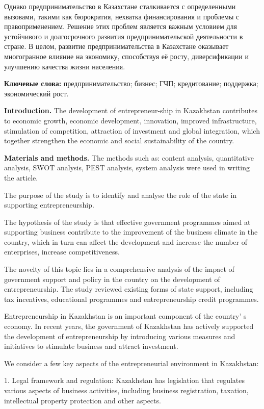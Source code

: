 Однако предпринимательство в Казахстане сталкивается с определенными
вызовами, такими как бюрократия, нехватка финансирования и проблемы с
правоприменением. Решение этих проблем является важным условием для
устойчивого и долгосрочного развития предпринимательской деятельности в
стране. В целом, развитие предпринимательства в Казахстане оказывает
многогранное влияние на экономику, способствуя её росту, диверсификации
и улучшению качества жизни населения.
\begingroup
\setlength{\parskip}{0pt}

{\bfseries Ключевые слова:} предпринимательство; бизнес; ГЧП; кредитование;
поддержка; экономический рост.

\begin{multicols}{2}
{\bfseries Introduction.} The development of entrepreneur-ship in Kazakhstan
contributes to economic growth, economic development, innovation,
improved infrastructure, stimulation of competition, attraction of
investment and global integration, which together strengthen the
economic and social sustainability of the country.

{\bfseries Materials and methods.} The methods such as: content analysis,
quantitative analysis, SWOT analysis, PEST analysis, system analysis
were used in writing the article.

The purpose of the study is to identify and analyse the role of the
state in supporting entrepreneurship.

The hypothesis of the study is that effective government programmes
aimed at supporting business contribute to the improvement of the
business climate in the country, which in turn can affect the
development and increase the number of enterprises, increase
competitiveness.

The novelty of this topic lies in a comprehensive analysis of the impact
of government support and policy in the country on the development of
entrepreneurship. The study reviewed existing forms of state support,
including tax incentives, educational programmes and entrepreneurship
credit programmes.

Entrepreneurship in Kazakhstan is an important component of the
country' s economy. In recent years, the government of
Kazakhstan has actively supported the development of entrepreneurship by
introducing various measures and initiatives to stimulate business and
attract investment.

We consider a few key aspects of the entrepreneurial environment in
Kazakhstan:

1. Legal framework and regulation: Kazakhstan has legislation that
regulates various aspects of business activities, including business
registration, taxation, intellectual property protection and other
aspects.


\end{multicols}
